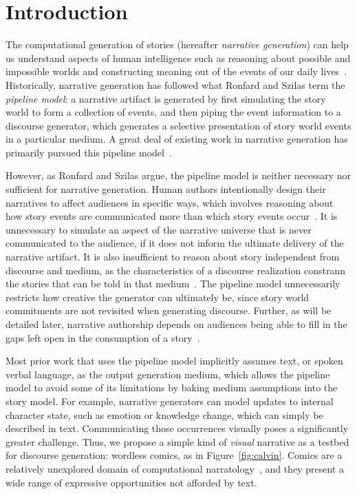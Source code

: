 \section{Introduction}

The computational generation of stories (hereafter {\em narrative
generation}) can help us understand %
aspects of
human intelligence%
such as reasoning about possible
and impossible worlds and constructing meaning out of the events of our daily
lives~\cite{herman2013storytelling}.  Historically, narrative generation
has followed what Ronfard and Szilas \cite{ronfard2014story} term the
\emph{pipeline model}: a narrative artifact is generated by first
simulating the story world to form a collection of events, and then piping
the event information to a discourse generator, which generates a selective
presentation of story world events in a particular medium. A great deal of
existing work in narrative generation has primarily pursued this pipeline
model~\cite{gervas2009computational}. 

However, as Ronfard and Szilas argue, the pipeline model is neither
necessary nor sufficient for narrative generation.  Human authors
intentionally design their narratives to affect audiences in specific ways,
which involves reasoning about how story events are communicated more than
which story events occur~\cite{chatman1980story,bordwell1989making}. It is
unnecessary to simulate an aspect of the narrative universe that is never
communicated to the audience, if it does not inform the ultimate delivery
of the narrative artifact. It is also insufficient to reason about story
independent from discourse and medium, as the characteristics of a
discourse realization constrann the stories that can be told in that
medium~\cite{herman2004toward}.  The pipeline model unnecessarily restricts
how creative the generator can ultimately be, since story world commitments
are not revisited when generating discourse. Further, as will be detailed
later, narrative authorship depends on audiences being able to fill in the
gaps left open in the consumption of a
story~\cite{saraceni2016relatedness,magliano2016filling}.

Most prior work that uses the pipeline model implicitly assumes text, or
spoken verbal language, as the output generation medium, which allows the
pipeline model to avoid some of its limitations by baking medium
assumptions into the story model. For example, narrative generators can
model updates to internal character state, such as emotion or knowledge
change, which can simply be described in text. Communicating those
occurrences visually poses a significantly greater challenge.
Thus, we propose a simple kind of {\em visual} narrative as a testbed for
discourse generation: wordless comics, as in Figure~\ref{fig:calvin}. 
Comics are a relatively unexplored
domain of computational narratology~\cite{mani2012computational}, and they
present a wide range of expressive opportunities not afforded by text.

